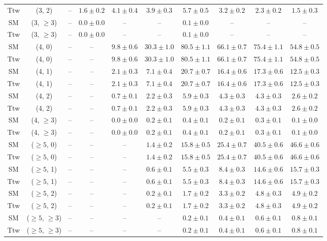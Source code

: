 \begin{table}[h!]
{\begin{tabular}{cccccccccc}
	Ttw & (3, 2) & -- & $1.6\pm 0.2$ & $4.1\pm 0.4$ & $3.9\pm 0.3$ & $5.7\pm 0.5$ & $3.2\pm 0.2$ & $2.3\pm 0.2$ & $1.5\pm 0.3$ \\[0.5ex] 
	SM & (3, $\ge3$) & -- & $0.0\pm 0.0$ & -- & -- & $0.1\pm 0.0$ & -- & -- & -- \\[0.5ex] 
	Ttw & (3, $\ge3$) & -- & $0.0\pm 0.0$ & -- & -- & $0.1\pm 0.0$ & -- & -- & -- \\[0.5ex] 
	SM & (4, 0) & -- & -- & $9.8\pm 0.6$ & $30.3\pm 1.0$ & $80.5\pm 1.1$ & $66.1\pm 0.7$ & $75.4\pm 1.1$ & $54.8\pm 0.5$ \\[0.5ex] 
	Ttw & (4, 0) & -- & -- & $9.8\pm 0.6$ & $30.3\pm 1.0$ & $80.5\pm 1.1$ & $66.1\pm 0.7$ & $75.4\pm 1.1$ & $54.8\pm 0.5$ \\[0.5ex] 
	SM & (4, 1) & -- & -- & $2.1\pm 0.3$ & $7.1\pm 0.4$ & $20.7\pm 0.7$ & $16.4\pm 0.6$ & $17.3\pm 0.6$ & $12.5\pm 0.3$ \\[0.5ex] 
	Ttw & (4, 1) & -- & -- & $2.1\pm 0.3$ & $7.1\pm 0.4$ & $20.7\pm 0.7$ & $16.4\pm 0.6$ & $17.3\pm 0.6$ & $12.5\pm 0.3$ \\[0.5ex] 
	SM & (4, 2) & -- & -- & $0.7\pm 0.1$ & $2.2\pm 0.3$ & $5.9\pm 0.3$ & $4.3\pm 0.3$ & $4.3\pm 0.3$ & $2.6\pm 0.2$ \\[0.5ex] 
	Ttw & (4, 2) & -- & -- & $0.7\pm 0.1$ & $2.2\pm 0.3$ & $5.9\pm 0.3$ & $4.3\pm 0.3$ & $4.3\pm 0.3$ & $2.6\pm 0.2$ \\[0.5ex] 
	SM & (4, $\ge3$) & -- & -- & $0.0\pm 0.0$ & $0.2\pm 0.1$ & $0.4\pm 0.1$ & $0.2\pm 0.1$ & $0.3\pm 0.1$ & $0.1\pm 0.0$ \\[0.5ex] 
	Ttw & (4, $\ge3$) & -- & -- & $0.0\pm 0.0$ & $0.2\pm 0.1$ & $0.4\pm 0.1$ & $0.2\pm 0.1$ & $0.3\pm 0.1$ & $0.1\pm 0.0$ \\[0.5ex] 
	SM & ($\ge5$, 0) & -- & -- & -- & $1.4\pm 0.2$ & $15.8\pm 0.5$ & $25.4\pm 0.7$ & $40.5\pm 0.6$ & $46.6\pm 0.6$ \\[0.5ex] 
	Ttw & ($\ge5$, 0) & -- & -- & -- & $1.4\pm 0.2$ & $15.8\pm 0.5$ & $25.4\pm 0.7$ & $40.5\pm 0.6$ & $46.6\pm 0.6$ \\[0.5ex] 
	SM & ($\ge5$, 1) & -- & -- & -- & $0.6\pm 0.1$ & $5.5\pm 0.3$ & $8.4\pm 0.3$ & $14.6\pm 0.6$ & $15.7\pm 0.3$ \\[0.5ex] 
	Ttw & ($\ge5$, 1) & -- & -- & -- & $0.6\pm 0.1$ & $5.5\pm 0.3$ & $8.4\pm 0.3$ & $14.6\pm 0.6$ & $15.7\pm 0.3$ \\[0.5ex] 
	SM & ($\ge5$, 2) & -- & -- & -- & $0.2\pm 0.1$ & $1.7\pm 0.2$ & $3.3\pm 0.2$ & $4.8\pm 0.3$ & $4.9\pm 0.2$ \\[0.5ex] 
	Ttw & ($\ge5$, 2) & -- & -- & -- & $0.2\pm 0.1$ & $1.7\pm 0.2$ & $3.3\pm 0.2$ & $4.8\pm 0.3$ & $4.9\pm 0.2$ \\[0.5ex] 
	SM & ($\ge5$, $\ge3$) & -- & -- & -- & -- & $0.2\pm 0.1$ & $0.4\pm 0.1$ & $0.6\pm 0.1$ & $0.8\pm 0.1$ \\[0.5ex] 
	Ttw & ($\ge5$, $\ge3$) & -- & -- & -- & -- & $0.2\pm 0.1$ & $0.4\pm 0.1$ & $0.6\pm 0.1$ & $0.8\pm 0.1$ \\[0.5ex] 
	\hline
	\hline
\end{tabular}}
\end{table}
